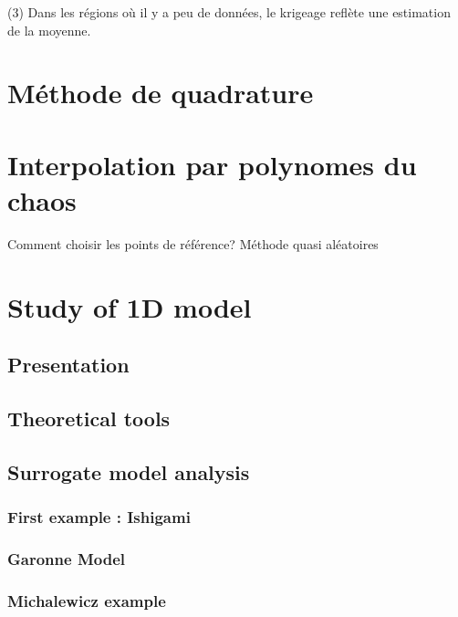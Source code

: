 \documentclass[hidelinks,12pt]{article}
\begin{document}
(3) Dans les régions où il y a peu de données, le krigeage reflète une estimation de la moyenne.

\section{Méthode de quadrature}
\section{Interpolation par polynomes du chaos}


Comment choisir les points de référence? Méthode quasi aléatoires
\section{}


\section{Study of 1D model}
\subsection{Presentation}
\subsection{Theoretical tools}
\subsection{Surrogate model analysis}
\subsubsection{First example : Ishigami}
\subsubsection{Garonne Model }



\subsubsection{Michalewicz example}






\end{document}
